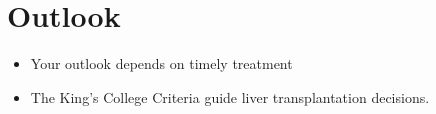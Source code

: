 \section{Outlook}
\begin{itemize}[noitemsep]
  \item Your outlook depends on timely treatment
  \item The King's College Criteria guide liver transplantation decisions.
\end{itemize}
